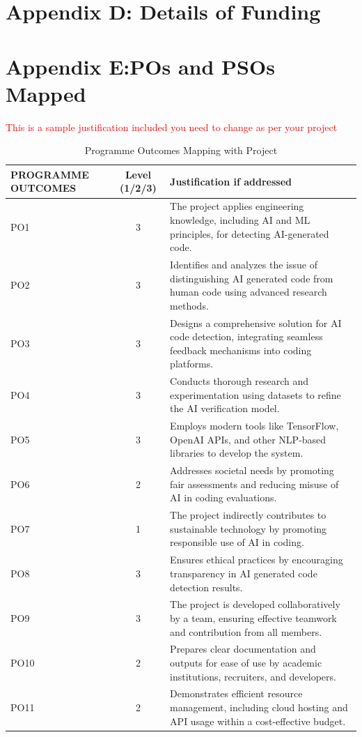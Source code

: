 \documentclass[12pt,a4paper]{report}
\begin{document}
\section {Appendix D: Details of Funding}
\clearpage

\section {Appendix E:POs and PSOs Mapped}
{\textcolor{red}{This is a  sample justification included you need to change as per your project}}
\begin{table}[h!]
\centering
\renewcommand{\arraystretch}{1.3} %
\setlength{\tabcolsep}{6pt}       %
\begin{tabular}{|p{3cm}|c|p{8cm}|}
\hline
\textbf{PROGRAMME OUTCOMES} & \textbf{Level (1/2/3)} & \textbf{Justification if addressed} \\
\hline
PO1 & 3 & The project applies engineering knowledge, including AI and ML principles, for detecting AI-generated code. \\
\hline
PO2 & 3 & Identifies and analyzes the issue of distinguishing AI generated code from human code using advanced research methods. \\
\hline
PO3 & 3 & Designs a comprehensive solution for AI code detection, integrating seamless feedback mechanisms into coding platforms. \\
\hline
PO4 & 3 & Conducts thorough research and experimentation using datasets to refine the AI verification model. \\
\hline
PO5 & 3 & Employs modern tools like TensorFlow, OpenAI APIs, and other NLP-based libraries to develop the system. \\
\hline
PO6 & 2 & Addresses societal needs by promoting fair assessments and reducing misuse of AI in coding evaluations. \\
\hline
PO7 & 1 & The project indirectly contributes to sustainable technology by promoting responsible use of AI in coding. \\
\hline
PO8 & 3 & Ensures ethical practices by encouraging transparency in AI generated code detection results. \\
\hline
PO9 & 3 & The project is developed collaboratively by a team, ensuring effective teamwork and contribution from all members. \\
\hline
PO10 & 2 & Prepares clear documentation and outputs for ease of use by academic institutions, recruiters, and developers. \\
\hline
PO11 & 2 & Demonstrates efficient resource management, including cloud hosting and API usage within a cost-effective budget. \\
\hline
\end{tabular}
\caption{Programme Outcomes Mapping with Project}
\end{table}
\end{document}
